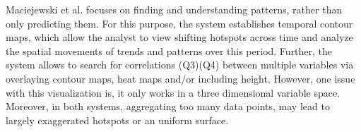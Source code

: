 \documentclass[electronic]{vgtc}             %
\begin{document}
Maciejewski et al. \cite{maciejewski:2010} focuses on finding and understanding patterns, rather than only predicting them.
For this purpose, the system establishes temporal contour maps, which allow the analyst to view shifting hotspots across time and analyze the spatial movements of trends and patterns over this period.
Further, the system allows to search for correlations (Q3)(Q4) between multiple variables via overlaying contour maps, heat maps and/or including height. 
However, one issue with this visualization is, it only works in a three dimensional variable space.
Moreover, in both systems, aggregating too many data points, may lead to largely exaggerated hotspots or an uniform surface. 
\end{document}
